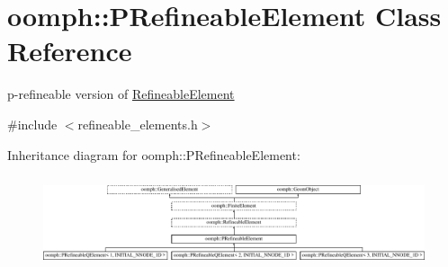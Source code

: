 \hypertarget{classoomph_1_1PRefineableElement}{}\section{oomph\+:\+:P\+Refineable\+Element Class Reference}
\label{classoomph_1_1PRefineableElement}


p-\/refineable version of \hyperlink{classoomph_1_1RefineableElement}{Refineable\+Element}  




{\ttfamily \#include $<$refineable\+\_\+elements.\+h$>$}

Inheritance diagram for oomph\+:\+:P\+Refineable\+Element\+:\begin{figure}[H]
\begin{center}
\leavevmode
\includegraphics[height=2.737048cm]{classoomph_1_1PRefineableElement}
\end{center}
\end{figure}
